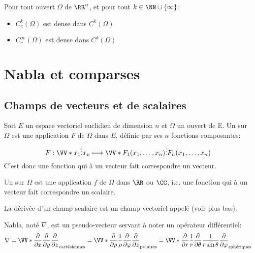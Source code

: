 Pour tout ouvert $\Omega$ de $\RR^n$, et pour tout $k\in\NN\cup\{\infty\}$:
\begin{itemize}
   \item $C_c^k(\Omega)$ est dense dans $C^k(\Omega)$
   \item $C_c^\infty(\Omega)$ est dense dans $C^k(\Omega)$
\end{itemize}

\medskip
\section{Nabla et comparses}
\subsection{Champs de vecteurs et de scalaires}
\begin{definition}
Soit $E$ un espace vectoriel euclidien
de dimension $n$ et $\Omega$ un ouvert de E.
Un  sur $\Omega$ est une application $F$ de $\Omega$ dans $E$,
définie par ses $n$ fonctions composantes:
\begin{equation}
    F : \VV*{x_1\\\vdots\\x_n} \longmapsto \VV*{F_1(x_1,\dots,x_n)\\ \vdots\\ F_n(x_1,\dots,x_n)}
\end{equation}
C'est donc une fonction qui à un vecteur fait correspondre un vecteur.
\end{definition}
\medskip
\begin{definition}
Un  sur $\Omega$ est une application $f$ de $\Omega$ dans $\RR$ ou $\CC$,
i.e. une fonction qui à un vecteur fait correspondre un scalaire.
\end{definition}
La dérivée d'un champ scalaire est un champ vectoriel appelé  (voir plus bas).

\medskip
{} Nabla, noté $\nabla$, est un pseudo-vecteur  servant à noter un opérateur
différentiel:
\begin{equation}
\nabla  = \VV*{{\dfrac\partial{\partial x}}\\ \dfrac\partial{\partial y}\\ \dfrac\partial{\partial z}}_{\text{cartésiennes}}
= \VV*{\dfrac\partial{\partial \rho}\\ \dfrac1\rho \dfrac\partial{\partial \varphi}\\ \dfrac\partial{\partial z}}_{\text{polaires}}
= \VV*{\dfrac\partial{\partial r}\\ \dfrac1r \dfrac\partial{\partial \theta}\\\dfrac1{r\sin\theta} \dfrac\partial{\partial \varphi}}_{\text{sphériques}}
\end{equation}

